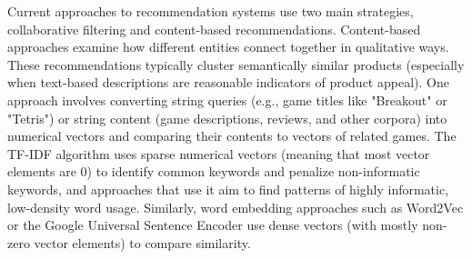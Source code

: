 \documentclass[10pt,twocolumn]{article}
\begin{document}

Current approaches to recommendation systems use two main strategies, collaborative filtering and content-based recommendations. Content-based approaches examine how different entities connect together in qualitative ways. These recommendations typically cluster semantically similar products (especially when text-based descriptions are reasonable indicators of product appeal). One approach involves converting string queries (e.g., game titles like "Breakout" or "Tetris") or string content (game descriptions, reviews, and other corpora) into numerical vectors and comparing their contents to vectors of related games. The TF-IDF algorithm uses sparse numerical vectors (meaning that most vector elements are 0) to identify common keywords and penalize non-informatic keywords, and approaches that use it aim to find patterns of highly informatic, low-density word usage. \cite{Meidl, Zhang, DWang} Similarly, word embedding approaches such as Word2Vec \cite{Word2Vec} or the Google Universal Sentence Encoder \cite{SentenceEncoder} use dense vectors (with mostly non-zero vector elements) to compare similarity.
\end{document}
